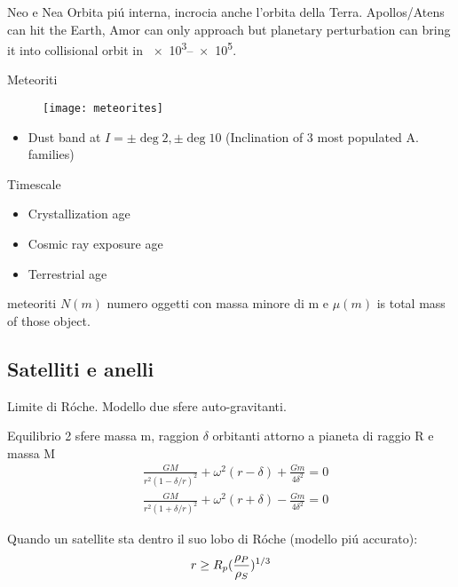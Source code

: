 \begin{wordonframe}{Neo e Nea}
Orbita pi\'u interna, incrocia anche l'orbita della Terra. Apollos/Atens can hit the Earth, Amor can only approach but planetary perturbation can bring it into collisional orbit in \SIrange{e3}{e5}{\year}. 
\end{wordonframe}

\begin{frame}{Meteoriti}
\begin{figure}[!ht]\texttt{[image: meteorites]}\end{figure}
\begin{itemize}
\item Dust band at $I=\pm\deg{2},\pm\deg{10}$ (Inclination of 3 most populated A. families)
\end{itemize}
\begin{block}{Timescale}
\begin{itemize}
\item Crystallization age
\item Cosmic ray exposure age
\item Terrestrial age
\end{itemize}
\end{block}
\end{frame}

\begin{wordonframe}{meteoriti}
$N(m)$ numero oggetti con massa minore di m e $\mu(m)$ is total mass of those object.
\end{wordonframe}

\subsection{Satelliti e anelli}

\begin{frame}{Limite di R\'oche. Modello due sfere auto-gravitanti.}
\begin{block}{Equilibrio 2 sfere massa m, raggion $\delta$ orbitanti attorno a pianeta di raggio R e massa M}
\begin{align*}
&\frac{GM}{r^2(1-\delta/r)^2}+\omega^2(r-\delta)+\frac{Gm}{4\delta^2}=0\\
&\frac{GM}{r^2(1+\delta/r)^2}+\omega^2(r+\delta)-\frac{Gm}{4\delta^2}=0
\end{align*}
\end{block}
Quando un satellite sta dentro il suo lobo di R\'oche (modello pi\'u accurato):
\begin{equation*}
r\geq R_p(\frac{\rho_P}{\rho_S})^{1/3}
\end{equation*}
\end{frame}

